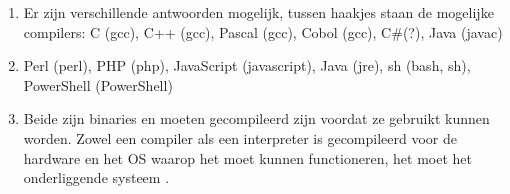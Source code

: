 \begin{enumerate}
\item Er zijn verschillende antwoorden mogelijk, tussen haakjes staan de mogelijke compilers: C (gcc), C++ (gcc), Pascal (gcc), Cobol (gcc), C\#(?), Java (javac)
\item Perl (perl), PHP (php), JavaScript (javascript), Java (jre), sh (bash, sh), PowerShell (PowerShell)
\item Beide zijn binaries en moeten gecompileerd zijn voordat ze gebruikt kunnen worden. Zowel een compiler als een interpreter is gecompileerd voor de hardware en het OS waarop het moet kunnen functioneren, het moet het onderliggende systeem .
\end{enumerate}
